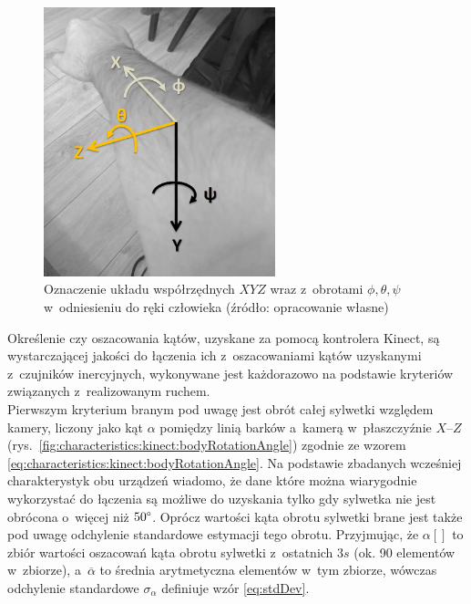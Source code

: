 \begin{savenotes}
	\begin{figure}[!htb]
		\centering	
		\includegraphics[width=0.6\textwidth]{images/handAxes.jpg}	
		\caption{Oznaczenie układu współrzędnych $XYZ$ wraz z~obrotami $\phi , \theta , \psi$ w~odniesieniu do ręki człowieka (źródło: opracowanie własne)}
		\label{fig:handAxes}
	\end{figure}
\end{savenotes}
												
Określenie czy oszacowania kątów, uzyskane za pomocą kontrolera Kinect, są wystarczającej jakości do łączenia ich z~oszacowaniami kątów uzyskanymi z~czujników inercyjnych, wykonywane jest każdorazowo na podstawie kryteriów związanych z~realizowanym ruchem. \\
Pierwszym kryterium branym pod uwagę jest obrót całej sylwetki względem kamery, liczony jako kąt $\alpha$ pomiędzy linią barków a~kamerą w~płaszczyźnie $X$--$Z$ (rys.~\ref{fig:characteristics:kinect:bodyRotationAngle}) zgodnie ze wzorem \ref{eq:characteristics:kinect:bodyRotationAngle}. Na podstawie zbadanych wcześniej charakterystyk obu urządzeń wiadomo, że dane które można wiarygodnie wykorzystać do łączenia są możliwe do uzyskania tylko gdy sylwetka nie jest obrócona o~więcej niż $50\degree$. Oprócz wartości kąta obrotu sylwetki brane jest także pod uwagę odchylenie standardowe estymacji tego obrotu. Przyjmując, że $\alpha[]$ to zbiór wartości oszacowań kąta obrotu sylwetki z~ostatnich $3s$ (ok. 90 elementów w~zbiorze), a~$\overline{\alpha}$ to średnia arytmetyczna elementów w~tym zbiorze, wówczas odchylenie standardowe $\sigma_\alpha$ definiuje wzór \ref{eq:stdDev}.
												
